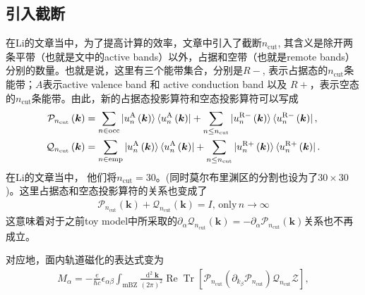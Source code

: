 \documentclass[10pt, oneside]{article}
\begin{document}
\subsection{引入截断}
在Li的文章当中，为了提高计算的效率，文章中引入了截断\(n_{\mathrm{cut}}\), 其含义是除开两条平带（也就是文中的active bands）以外，占据和空带（也就是remote bands）分别的数量。也就是说，这里有三个能带集合，分别是\(R-\), 表示占据态的\(n_{\mathrm{cut}}\)条能带；\(A \)表示active valence band 和 active conduction band 以及 \(R+\)，表示空态的\(n_{\mathrm{cut}}\)条能带。由此，新的占据态投影算符和空态投影算符可以写成
\begin{align}
	\mathcal{P}_{n_{\mathrm{cut}}} \left(\bm{k}\right) &= \sum_{n \in \mathrm{occ} } \ket{u_{n }^{\mathrm{A }} \left(\bm{k}\right)} \bra{u_{n }^{\mathrm{A }} \left(\bm{k}\right)} + \sum_{n \leq n_{\mathrm{cut}}} \ket{u_{n }^{\mathrm{R- }} \left(\bm{k}\right)} \bra{u_{n }^{\mathrm{R-}} \left(\bm{k}\right)},\\
	\mathcal{Q}_{n_{\mathrm{cut}}} \left(\bm{k}\right) &= \sum_{n \in \mathrm{emp} } \ket{u_{n }^{\mathrm{A }} \left(\bm{k}\right)} \bra{u_{n }^{\mathrm{A }} \left(\bm{k}\right)} + \sum_{n \leq n_{\mathrm{cut}}} \ket{u_{n }^{\mathrm{R+}} \left(\bm{k}\right)} \bra{u_{n }^{\mathrm{R+}} \left(\bm{k}\right)}.
\end{align}
在Li的文章当中， 他们将\(n_{\mathrm{cut}} = 30\)。(同时莫尔布里渊区的分割也设为了\(30 \times 30\))。这里占据态和空态投影算符的关系也变成了
\begin{align}
	\mathcal{P}_{n_{\mathrm{cut}}} \left(\bm{k}\right) + \mathcal{Q}_{n_{\mathrm{cut}}} \left(\bm{k}\right) = I, \, \mathrm{only} \, n \rightarrow \infty
\end{align}
这意味着对于之前toy model中所采取的\( \partial_{\alpha} \mathcal{Q}_{n_{\mathrm{cut}}} \left(\bm{k}\right) = - \partial_{\alpha} \mathcal{P}_{n_{\mathrm{cut}}} \left(\bm{k}\right)\)关系也不再成立。

对应地，面内轨道磁化的表达式变为
\begin{align}
	M_{\alpha} = - \frac{e }{\hbar c} \epsilon_{\alpha \beta} \int_{\mathrm{mBZ}} \frac{\operatorname{d}^{2} \bm{k}}{\left(2 \pi\right)^2} \operatorname{Re} \operatorname{Tr} \left[ \mathcal{P}_{n_{\mathrm{cut}}} \left(\partial_{k_{\beta}} \mathcal{P}_{n_{\mathrm{cut}}}\right) \mathcal{Q}_{n_{\mathrm{cut}}} \mathcal{Z} \right] ,
\end{align}
\end{document}
